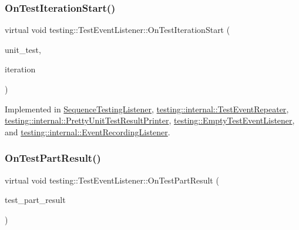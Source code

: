 \mbox{\label{classtesting_1_1TestEventListener_a60cc09b7907cb329d152eb5e7133bdeb}} 
\subsubsection{\texorpdfstring{OnTestIterationStart()}{OnTestIterationStart()}}
{\footnotesize\ttfamily virtual void testing\+::\+Test\+Event\+Listener\+::\+On\+Test\+Iteration\+Start (\begin{DoxyParamCaption}\item[{const \mbox{\hyperlink{classtesting_1_1UnitTest}{Unit\+Test}} \&}]{unit\+\_\+test,  }\item[{int}]{iteration }\end{DoxyParamCaption})\hspace{0.3cm}{\ttfamily [pure virtual]}}



Implemented in \mbox{\hyperlink{classSequenceTestingListener_a345641262fa10cc4b251ac54116db74b}{Sequence\+Testing\+Listener}}, \mbox{\hyperlink{classtesting_1_1internal_1_1TestEventRepeater_a4062b3f070bb6531ab8494c13d3635d3}{testing\+::internal\+::\+Test\+Event\+Repeater}}, \mbox{\hyperlink{classtesting_1_1internal_1_1PrettyUnitTestResultPrinter_abdba10a8c97e272ab4cee97cb652c957}{testing\+::internal\+::\+Pretty\+Unit\+Test\+Result\+Printer}}, \mbox{\hyperlink{classtesting_1_1EmptyTestEventListener_a836f05829855dc60d13ba99ad712c0dd}{testing\+::\+Empty\+Test\+Event\+Listener}}, and \mbox{\hyperlink{classtesting_1_1internal_1_1EventRecordingListener_a0bfa276def9594b2a119c2c370f59281}{testing\+::internal\+::\+Event\+Recording\+Listener}}.

\mbox{\label{classtesting_1_1TestEventListener_a054f8705c883fa120b91473aff38f2ee}} 
\subsubsection{\texorpdfstring{OnTestPartResult()}{OnTestPartResult()}}
{\footnotesize\ttfamily virtual void testing\+::\+Test\+Event\+Listener\+::\+On\+Test\+Part\+Result (\begin{DoxyParamCaption}\item[{const Test\+Part\+Result \&}]{test\+\_\+part\+\_\+result }\end{DoxyParamCaption})\hspace{0.3cm}{\ttfamily [pure virtual]}}




